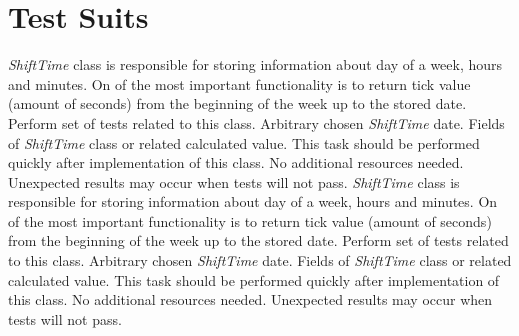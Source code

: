 \chapter{Test Suits} \label{chp:test-suits}
	{
		{
			\emph{ShiftTime} class is responsible for storing information about day of a week, hours and minutes. On of the most important functionality is to return tick value (amount of seconds) from the beginning of the week up to the stored date.
		}
		{
			Perform set of tests related to this class. 
		}
		{
			Arbitrary chosen \emph{ShiftTime} date.   
		}
		{
			Fields of \emph{ShiftTime} class or related calculated value.
		}
		{
			This task should be performed quickly after implementation of this class.
		}
		{
			No additional resources needed.
		}
		{
			Unexpected results may occur when tests will not pass. 
		}
	}
	{
		{
			\emph{ShiftTime} class is responsible for storing information about day of a week, hours and minutes. On of the most important functionality is to return tick value (amount of seconds) from the beginning of the week up to the stored date.
		}
		{
			Perform set of tests related to this class. 
		}
		{
			Arbitrary chosen \emph{ShiftTime} date.   
		}
		{
			Fields of \emph{ShiftTime} class or related calculated value.
		}
		{
			This task should be performed quickly after implementation of this class.
		}
		{
			No additional resources needed.
		}
		{
			Unexpected results may occur when tests will not pass. 
		}
	}